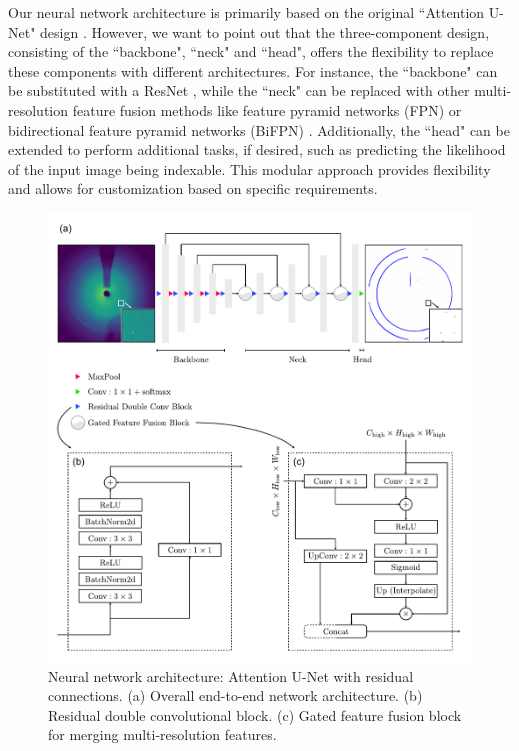 \documentclass[a4paper]{article}
\begin{document}
Our neural network architecture is primarily based on the original ``Attention U-Net" design \citep{oktayAttentionUNetLearning2018}.  However, we want to point out that the three-component design, consisting of the ``backbone", ``neck" and ``head", offers the flexibility to replace these components with different architectures.  For instance, the ``backbone" can be substituted with a ResNet \citep{heDeepResidualLearning2016}, while the ``neck" can be replaced with other multi-resolution feature fusion methods like feature pyramid networks (FPN) \citep{linFeaturePyramidNetworks2017} or bidirectional feature pyramid networks (BiFPN) \citep{tanEfficientDetScalableEfficient2020}.  Additionally, the ``head" can be extended to perform additional tasks, if desired, such as predicting the likelihood of the input image being indexable.  This modular approach provides flexibility and allows for customization based on specific requirements.

\begin{figure}[!ht]
\includegraphics[width=\textwidth,keepaspectratio]
{./figures/network_arc.pdf}
\caption{Neural network architecture: Attention U-Net with residual connections.
(a) Overall end-to-end network architecture.  (b) Residual double
convolutional block.  (c) Gated feature fusion block for merging
multi-resolution features.}
\label{fig : network arc}
\end{figure}
\end{document}
